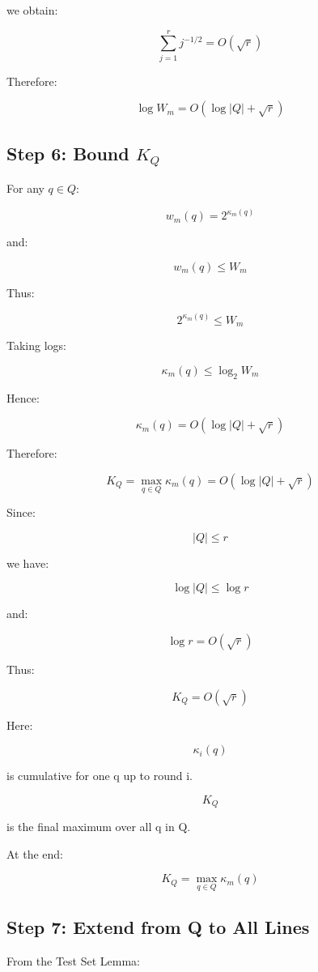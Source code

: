 \documentclass[
  11pt,
]{article}
\begin{document}
we obtain:

\[
\sum_{j=1}^{r}j^{-1/2}=O(\sqrt r)
\]

Therefore:

\[
\log W_m = O(\log |Q|+\sqrt r)
\]

\hypertarget{step-6-bound-k_q}{%
\subsection{\texorpdfstring{Step 6: Bound
\(K_Q\)}{Step 6: Bound K\_Q}}\label{step-6-bound-k_q}}

For any \(q\in Q\):

\[
w_m(q)=2^{\kappa_m(q)}
\]

and:

\[
w_m(q)\le W_m
\]

Thus:

\[
2^{\kappa_m(q)}\le W_m
\]

Taking logs:

\[
\kappa_m(q)\le \log_2 W_m
\]

Hence:

\[
\kappa_m(q)=O(\log |Q|+\sqrt r)
\]

Therefore:

\[
K_Q = \max_{q\in Q}\kappa_m(q) = O(\log |Q|+\sqrt r)
\]

Since:

\[
|Q|\le r
\]

we have:

\[
\log |Q|\le \log r
\]

and:

\[
\log r=O(\sqrt r)
\]

Thus:

\[
K_Q=O(\sqrt r)
\]

Here:

\[
\kappa_i(q)
\]

is cumulative for one q up to round i.

\[
K_Q
\]

is the final maximum over all q in Q.

At the end:

\[
K_Q=\max_{q\in Q}\kappa_m(q)
\]

\hypertarget{step-7-extend-from-q-to-all-lines}{%
\subsection{Step 7: Extend from Q to All
Lines}\label{step-7-extend-from-q-to-all-lines}}

From the Test Set Lemma:
\end{document}
